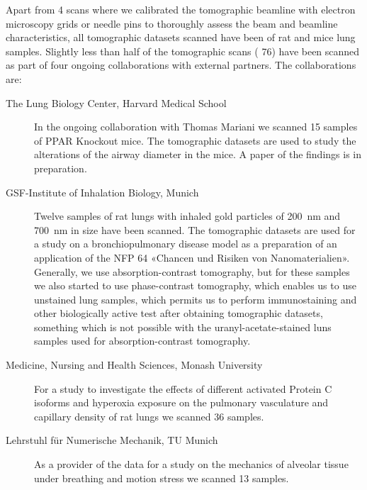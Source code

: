 \documentclass[a4paper,twoside,english,DIV=calc]{scrartcl}
\begin{document}
Apart from 4 scans where we calibrated the tomographic beamline with electron microscopy grids or needle pins to thoroughly assess the beam and beamline characteristics, all tomographic datasets scanned have been of rat and mice lung samples. Slightly less than half of the tomographic scans (%
76) have been scanned as part of four ongoing collaborations with external partners. The collaborations are:
\begin{description}
\item[The Lung Biology Center, Harvard Medical School] In the ongoing collaboration with Thomas Mariani we scanned 15 samples of PPAR Knockout mice. The tomographic datasets are used to study the alterations of the airway diameter in the mice. A paper of the findings is in preparation.
\item[GSF-Institute of Inhalation Biology, Munich] Twelve samples of rat lungs with inhaled gold particles of \SI{200}{\nano\meter} and \SI{700}{\nano\meter} in size have been scanned. The tomographic datasets are used for a study on a bronchiopulmonary disease model as a preparation of an application of the  NFP 64 «Chancen und Risiken von Nanomaterialien». Generally, we use absorption-contrast tomography, but for these samples we also started to use phase-contrast tomography, which enables us to use unstained lung samples, which permits us to perform immunostaining and other biologically active test after obtaining tomographic datasets, something which is not possible with the uranyl-acetate-stained luns samples used for absorption-contrast tomography.
\item[Medicine, Nursing and Health Sciences, Monash University] For a study to investigate the effects of different activated Protein C isoforms and hyperoxia exposure on the pulmonary vasculature and capillary density of rat lungs we scanned 36 samples. 
\item[Lehrstuhl für Numerische Mechanik, TU Munich] As a provider of the data for a study on the mechanics of alveolar tissue under breathing and motion stress we scanned 13 samples.
\end{description}
\end{document}
